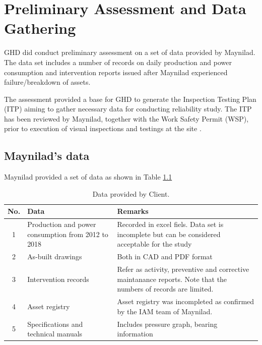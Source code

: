 \chapter{Preliminary Assessment and Data Gathering} %
\label{Chapter2}
GHD did conduct preliminary assessment on a set of data provided by Maynilad. The data set includes a number of records on daily production and power consumption and intervention reports issued after Maynilad experienced failure/breakdown of assets.

The assessment provided a base for GHD to generate the Inspection Testing Plan (ITP) \cite{GHD2018} aiming to gather necessary data for conducting reliability study. The ITP has been reviewed by Maynilad, together with the Work Safety Permit (WSP), prior to execution of visual inspections and testings at the site \cite{GHD2018e}.

\section{Maynilad's data}
\label{21}
Maynilad provided a set of data as shown in Table \ref{mayniladdata}

\begin{table}[h]
	\caption{Data provided by Client.}
	\label{mayniladdata}
	{\footnotesize
\begin{tabular}{l|p{5cm}|p{8cm}}
	\hline
	\multicolumn{1}{c|}{No.} & Data & Remarks \\ 
	\hline
	\multicolumn{1}{c|}{1} & Production and power consumption from 2012 to 2018 & Recorded in excel fiels. Data set is incomplete but can be considered acceptable for the study \\ 
	\multicolumn{1}{c|}{2} & As-built drawings & Both in CAD and PDF format \\ 
	\multicolumn{1}{c|}{3} & Intervention records & Refer as activity, preventive and corrective maintanance reports. Note that the numbers of records are limited. \\ 
	\multicolumn{1}{c|}{4} & Asset registry & Asset registry was incompleted as confirmed by the IAM team of Maynilad. \\ 
	\multicolumn{1}{c|}{5} & Specifications and technical manuals & Includes pressure graph, bearing information \\ 
	\hline
\end{tabular}
	}
\end{table}


